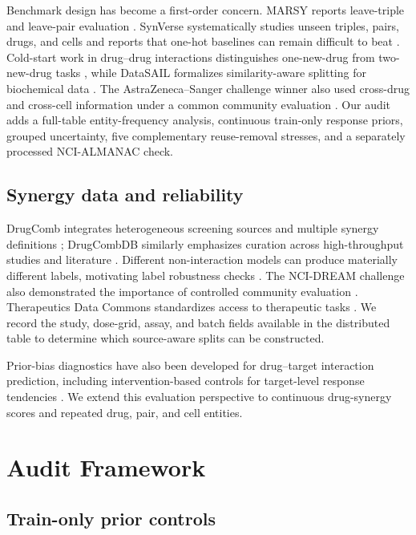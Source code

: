 \documentclass[conference]{IEEEtran}
\begin{document}
Benchmark design has become a first-order concern. MARSY reports leave-triple and leave-pair evaluation \cite{marsy2023}. SynVerse systematically studies unseen triples, pairs, drugs, and cells and reports that one-hot baselines can remain difficult to beat \cite{synverse2025}. Cold-start work in drug--drug interactions distinguishes one-new-drug from two-new-drug tasks \cite{dewulf2021cold}, while DataSAIL formalizes similarity-aware splitting for biochemical data \cite{datasail2025}. The AstraZeneca--Sanger challenge winner also used cross-drug and cross-cell information under a common community evaluation \cite{networkprop2018}. Our audit adds a full-table entity-frequency analysis, continuous train-only response priors, grouped uncertainty, five complementary reuse-removal stresses, and a separately processed NCI-ALMANAC check.

\subsection{Synergy data and reliability}

DrugComb integrates heterogeneous screening sources and multiple synergy definitions \cite{drugcomb2019}; DrugCombDB similarly emphasizes curation across high-throughput studies and literature \cite{drugcombdb2020}. Different non-interaction models can produce materially different labels, motivating label robustness checks \cite{amzallag2019,musyc2021}. The NCI-DREAM challenge also demonstrated the importance of controlled community evaluation \cite{bansal2014}. Therapeutics Data Commons standardizes access to therapeutic tasks \cite{tdc2021}. We record the study, dose-grid, assay, and batch fields available in the distributed table to determine which source-aware splits can be constructed.

Prior-bias diagnostics have also been developed for drug--target interaction prediction, including intervention-based controls for target-level response tendencies \cite{lin2025tapb}. We extend this evaluation perspective to continuous drug-synergy scores and repeated drug, pair, and cell entities.

\section{Audit Framework}

\subsection{Train-only prior controls}
\end{document}
